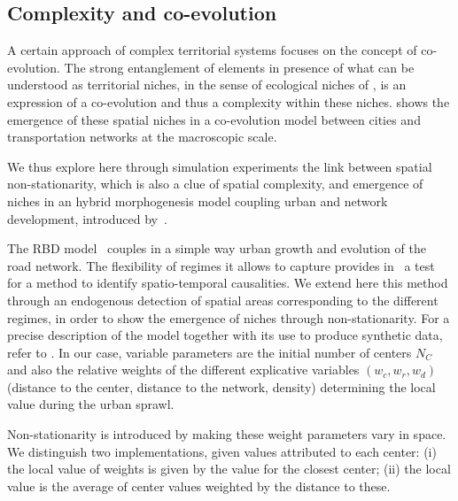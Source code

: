 \documentclass[fleqn,10pt]{wlscirep}
\begin{document}



\subsection*{Complexity and co-evolution}



A certain approach of complex territorial systems focuses on the concept of co-evolution. The strong entanglement of elements in presence of what can be understood as territorial niches, in the sense of ecological niches of \cite{holland2012signals}, is an expression of a co-evolution and thus a complexity within these niches. \cite{raimbault2018modeling} shows the emergence of these spatial niches in a co-evolution model between cities and transportation networks at the macroscopic scale.


We thus explore here through simulation experiments the link between spatial non-stationarity, which is also a clue of spatial complexity, and emergence of niches in an hybrid morphogenesis model coupling urban and network development, introduced by~\cite{raimbault2014hybrid}.


The RBD model~\cite{raimbault2014hybrid} couples in a simple way urban growth and evolution of the road network. The flexibility of regimes it allows to capture provides in~\cite{raimbault2017identification} a test for a method to identify spatio-temporal causalities. We extend here this method through an endogenous detection of spatial areas corresponding to the different regimes, in order to show the emergence of niches through non-stationarity. For a precise description of the model together with its use to produce synthetic data, refer to \cite{raimbault2018caracterisation}. In our case, variable parameters are the initial number of centers $N_C$ and also the relative weights of the different explicative variables $(w_c,w_r,w_d)$ (distance to the center, distance to the network, density) determining the local value during the urban sprawl.



Non-stationarity is introduced by making these weight parameters vary in space. We distinguish two implementations, given values attributed to each center: (i) the local value of weights is given by the value for the closest center; (ii) the local value is the average of center values weighted by the distance to these.
\end{document}
